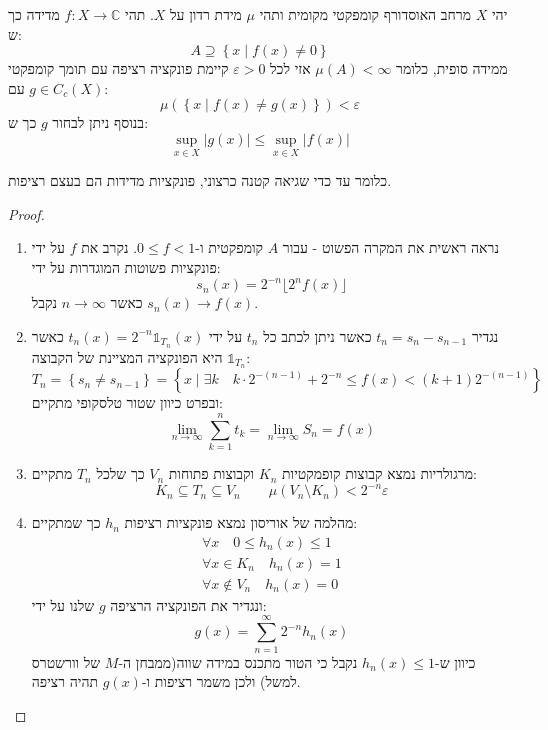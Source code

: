 \documentclass{tstextbook}
\begin{document}
\begin{theorem}
יהי \(X\) מרחב האוסדורף קומפקטי מקומית ותהי \(\mu\) מידת רדון על \(X\). תהי \(f:X\to \mathbb{C}\) מדידה כך ש:
$$A\supseteq\left\{  x\mid f(x)\neq 0  \right\}$$
ממידה סופית, כלומר \(\mu(A)<\infty\) אזי לכל \(\varepsilon> 0\) קיימת פונקציה רציפה עם תומך קומפקטי \(g \in C_{c}(X)\) עם:
$$\mu\left( \left\{  x\mid f(x)\neq g(x)  \right\} \right)< \varepsilon$$
בנוסף ניתן לבחור \(g\) כך ש:
$$\sup _{x \in X}\lvert g(x) \rvert \leq \sup _{x \in X} \lvert f(x) \rvert $$

\end{theorem}
כלומר עד כדי שגיאה קטנה כרצוני, פונקציות מדידות הם בעצם רציפות.

\begin{proof}
  \begin{enumerate}
    \item נראה ראשית את המקרה הפשוט - עבור \(A\) קומפקטית ו-\(0\leq f< 1\). נקרב את \(f\) על ידי פונקציות פשוטות המוגדרות על ידי: 
$$s_{n}(x)=2^{-n}\lfloor2^{n}f(x)\rfloor$$
כאשר \(n\to \infty\) נקבל \(s_{n}(x)\to f(x)\).


    \item נגדיר \(t_{n}=s_{n}-s_{n-1}\) כאשר ניתן לכתב כל \(t_{n}\) על ידי \(t_{n}(x)=2^{-n}\mathbb{1}_{T_{n}}(x)\) כאשר \(\mathbb{1}_{T_{n}}\) היא הפונקציה המציינת של הקבוצה: 
$$T_{n}=\left\{  s_{n}\neq s_{n-1}  \right\}=\left\{ x\mid\exists k\quad k\cdot2^{-(n-1)}+2^{-n}\leq f(x)<(k+1)2^{-(n-1)} \right\}$$
ובפרט כיוון שטור טלסקופי מתקיים:
$$\lim_{ n \to \infty } \sum _{k=1}^{n}t_{k}=\lim_{ n \to \infty } S_{n}=f(x)$$


    \item מרגולריות נמצא קבוצות קופמקטיות \(K_{n}\) וקבוצות פתוחות \(V_{n}\) כך שלכל \(T_{n}\) מתקיים: 
$$K_{n}\subseteq T_{n}\subseteq V_{n}\qquad \mu\left( V_{n}\setminus  K_{n} \right)< 2^{-n}\varepsilon$$


    \item מהלמה של אוריסון נמצא פונקציות רציפות \(h_{n}\) כך שמתקיים: 
\begin{gather*}\forall x \quad 0\leq h_{n}(x)\leq 1  \\\forall x \in K_{n}\quad h_{n}(x)=1 \\\forall x \not  \in V_{n} \quad h_{n}(x)=0
\end{gather*}
ונגדיר את הפונקציה הרציפה \(g\) שלנו על ידי:
$$g(x)=\sum_{n=1}^{\infty}2^{-n}h_{n}(x)$$
כיוון ש-\(h_{n}(x)\leq 1\) נקבל כי הטור מתכנס במידה שווה(ממבחן ה-\(M\) של וורשטרס למשל) ולכן משמר רציפות ו-\(g(x)\) תהיה רציפה.



\end{enumerate}
\end{proof}
\end{document}
